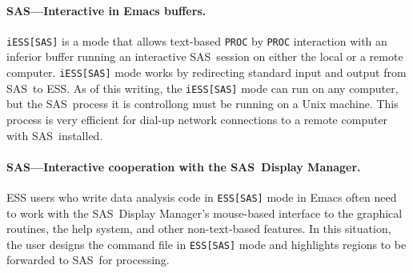 \documentclass{article}
\newcommand*{\SAS}{\textsc{SAS}}
\newcommand{\stexttt}[1]{{\small\texttt{#1}}}
\begin{document}
\paragraph{\SAS---Interactive in Emacs buffers.}

\stexttt{iESS[SAS]} is a mode that allows text-based \stexttt{PROC} by
\stexttt{PROC} interaction with an inferior buffer running an
interactive \SAS\ session on either the local or 
a remote computer.  \stexttt{iESS[SAS]} mode works by
redirecting standard input and output from \SAS\ to ESS.
As of this writing, the \stexttt{iESS[SAS]} mode can run on any computer,
but the \SAS\ process it is controllong must be running  on a Unix machine.
This process is very efficient for dial-up network connections to
a remote computer with \SAS\ installed.


\paragraph{\SAS---Interactive cooperation with the \SAS\ Display Manager.}
ESS users who write data analysis code in \stexttt{ESS[SAS]} mode in Emacs
often need to work with the \SAS\ Display Manager's
mouse-based interface to the graphical
routines, the help system, and other non-text-based features.
In this situation, the user
designs the command file in \stexttt{ESS[SAS]} mode and highlights
regions to be forwarded to \SAS\ for processing.
%
%
%
\end{document}
